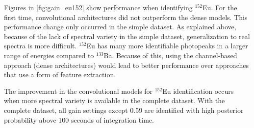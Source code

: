Figures in \ref{fig:gain_eu152} show performance when identifying $^{152}$Eu. For the first time, convolutional architectures did not outperform the dense models. This performance change only occurred in the simple dataset. As explained above, because of the lack of spectral variety in the simple dataset, generalization to real spectra is more difficult. $^{152}$Eu has many more identifiable photopeaks in a larger range of energies compared to $^{133}$Ba. Because of this, using the channel-based approach (dense architectures) would lead to better performance over approaches that use a form of feature extraction.

The improvement in the convolutional models for $^{152}$Eu identification occurs when more spectral variety is available in the complete dataset. With the complete dataset, all gain settings except 0.59 are identified with high posterior probability above 100 seconds of integration time. 



